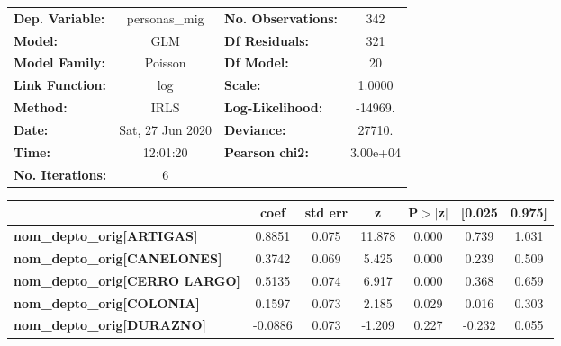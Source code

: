 \begin{center}
\begin{tabular}{lclc}
\toprule
\textbf{Dep. Variable:}                   &  personas\_mig   & \textbf{  No. Observations:  } &      342    \\
\textbf{Model:}                           &       GLM        & \textbf{  Df Residuals:      } &      321    \\
\textbf{Model Family:}                    &     Poisson      & \textbf{  Df Model:          } &       20    \\
\textbf{Link Function:}                   &       log        & \textbf{  Scale:             } &    1.0000   \\
\textbf{Method:}                          &       IRLS       & \textbf{  Log-Likelihood:    } &   -14969.   \\
\textbf{Date:}                            & Sat, 27 Jun 2020 & \textbf{  Deviance:          } &    27710.   \\
\textbf{Time:}                            &     12:01:20     & \textbf{  Pearson chi2:      } &  3.00e+04   \\
\textbf{No. Iterations:}                  &        6         & \textbf{                     } &             \\
\bottomrule
\end{tabular}
\begin{tabular}{lcccccc}
                                          & \textbf{coef} & \textbf{std err} & \textbf{z} & \textbf{P$> |$z$|$} & \textbf{[0.025} & \textbf{0.975]}  \\
\midrule
\textbf{nom\_depto\_orig[ARTIGAS]}        &       0.8851  &        0.075     &    11.878  &         0.000        &        0.739    &        1.031     \\
\textbf{nom\_depto\_orig[CANELONES]}      &       0.3742  &        0.069     &     5.425  &         0.000        &        0.239    &        0.509     \\
\textbf{nom\_depto\_orig[CERRO LARGO]}    &       0.5135  &        0.074     &     6.917  &         0.000        &        0.368    &        0.659     \\
\textbf{nom\_depto\_orig[COLONIA]}        &       0.1597  &        0.073     &     2.185  &         0.029        &        0.016    &        0.303     \\
\textbf{nom\_depto\_orig[DURAZNO]}        &      -0.0886  &        0.073     &    -1.209  &         0.227        &       -0.232    &        0.055     \\

\end{tabular}
\end{center}
